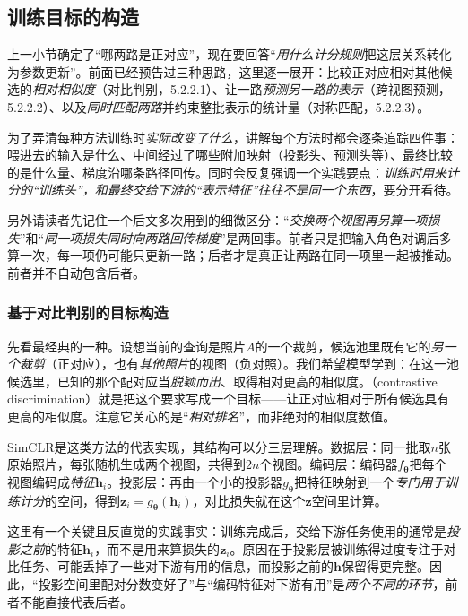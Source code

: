 \subsection{训练目标的构造}
\label{sec:data-derived-knowledge-training-objectives}

上一小节确定了“哪两路是正对应”，现在要回答“\emph{用什么计分规则}把这层关系转化为参数更新”。前面已经预告过三种思路，这里逐一展开：比较正对应相对其他候选的\emph{相对相似度}（对比判别，5.2.2.1）、让一路\emph{预测另一路的表示}（跨视图预测，5.2.2.2）、以及\emph{同时匹配两路}并约束整批表示的统计量（对称匹配，5.2.2.3）。

为了弄清每种方法训练时\emph{实际改变了什么}，讲解每个方法时都会逐条追踪四件事：喂进去的输入是什么、中间经过了哪些附加映射（投影头、预测头等）、最终比较的是什么量、梯度沿哪条路径回传。同时会反复强调一个实践要点：\emph{训练时用来计分的“训练头”，和最终交给下游的“表示特征”往往不是同一个东西}，要分开看待。

另外请读者先记住一个后文多次用到的细微区分：“\emph{交换两个视图再另算一项损失}”和“\emph{同一项损失同时向两路回传梯度}”是两回事。前者只是把输入角色对调后多算一次，每一项仍可能只更新一路；后者才是真正让两路在同一项里一起被推动。前者并不自动包含后者。

\Needspace{80mm}
\subsubsection{基于对比判别的目标构造}
\label{sec:data-derived-knowledge-contrastive}

先看最经典的一种。设想当前的查询是照片$A$的一个裁剪，候选池里既有它的\emph{另一个裁剪}（正对应），也有\emph{其他照片}的视图（负对照）。我们希望模型学到：在这一池候选里，已知的那个配对应当\emph{脱颖而出}、取得相对更高的相似度。（contrastive discrimination）就是把这个要求写成一个目标——让正对应相对于所有候选具有更高的相似度。注意它关心的是“\emph{相对排名}”，而非绝对的相似度数值。

SimCLR是这类方法的代表实现，其结构可以分三层理解。数据层：同一批取$n$张原始照片，每张随机生成两个视图，共得到$2n$个视图。编码层：编码器$f_{\bm{\theta}}$把每个视图编码成\emph{特征}$\bm{h}_i$。投影层：再由一个小的投影器$g_{\bm{\theta}}$把特征映射到一个\emph{专门用于训练计分}的空间，得到$\bm{z}_i=g_{\bm{\theta}}(\bm{h}_i)$，对比损失就在这个$\bm{z}$空间里计算。

这里有一个关键且反直觉的实践事实：训练完成后，交给下游任务使用的通常是\emph{投影之前}的特征$\bm{h}_i$，而不是用来算损失的$\bm{z}_i$。原因在于投影层被训练得过度专注于对比任务、可能丢掉了一些对下游有用的信息，而投影之前的$\bm{h}$保留得更完整。因此，“投影空间里配对分数变好了”与“编码特征对下游有用”是\emph{两个不同的环节}，前者不能直接代表后者。

